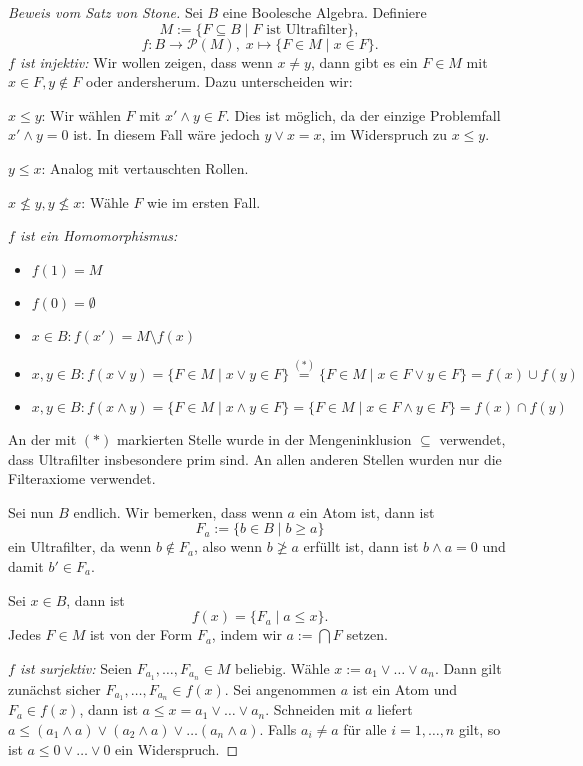 \begin{proof}[Beweis vom Satz von Stone]
    Sei $B$ eine Boolesche Algebra. Definiere
    $$ M := \{ F \subseteq B \mid F \text{ ist Ultrafilter} \}, $$
    $$ f : B \to \mathcal{P}(M), \; x \mapsto \{ F \in M \mid x \in F \}. $$
    \textit{$f$ ist injektiv:} Wir wollen zeigen, dass wenn $x \neq y$, dann gibt es ein $F \in M$ mit $x \in F, y \notin F$ oder andersherum. Dazu unterscheiden wir:

    $ x \leq y $: Wir wählen $F$ mit $x' \land y \in F$. Dies ist möglich, da der einzige Problemfall $x' \land y = 0$ ist. In diesem Fall wäre jedoch $y \lor x = x$, im Widerspruch zu $x \leq y$.

    $ y \leq x $: Analog mit vertauschten Rollen.

    $ x \nleq y, y \nleq x $: Wähle $F$ wie im ersten Fall.

    \textit{$f$ ist ein Homomorphismus:}
    \begin{itemize}
        \item $f(1) = M$
        \item $f(0) = \emptyset$
        \item $x \in B: f(x') = M \setminus f(x)$
        \item $x, y \in B: f(x \lor y) = \{ F \in M \mid x \lor y \in F \} \stackrel{(*)}{=} \{ F \in M \mid x \in F \lor y \in F \} = f(x) \cup f(y)$
        \item $x, y \in B: f(x \land y) = \{ F \in M \mid x \land y \in F \} = \{ F \in M \mid x \in F \land y \in F \} = f(x) \cap f(y)$
    \end{itemize}
    An der mit $(*)$ markierten Stelle wurde in der Mengeninklusion \glqq$\subseteq$\grqq{} verwendet, dass Ultrafilter insbesondere prim sind. An allen anderen Stellen wurden nur die Filteraxiome verwendet.

    Sei nun $B$ endlich. Wir bemerken, dass wenn $a$ ein Atom ist, dann ist
    $$ F_a := \{ b \in B \mid b \geq a \} $$
    ein Ultrafilter, da wenn $b \notin F_a$, also wenn $b \ngeq a$ erfüllt ist, dann ist $b \land a = 0$ und damit $b' \in F_a$.

    Sei $x \in B$, dann ist
    $$ f(x) = \{ F_a \mid a \leq x \}. $$
    Jedes $F \in M$ ist von der Form $F_a$, indem wir $a := \bigcap F$ setzen.

    \textit{$f$ ist surjektiv:} Seien $F_{a_1}, \hdots, F_{a_n} \in M$ beliebig. Wähle $x := a_1 \lor \hdots \lor a_n$. Dann gilt zunächst sicher $F_{a_1}, \hdots, F_{a_n} \in f(x)$. Sei angenommen $a$ ist ein Atom und $F_a \in f(x)$, dann ist $a \leq x = a_1 \lor \hdots \lor a_n$. Schneiden mit $a$ liefert $a \leq (a_1 \land a) \lor (a_2 \land a) \lor \hdots (a_n \land a)$. Falls $a_i \neq a$ für alle $i=1,\ldots,n$ gilt, so ist $a \leq 0 \lor \hdots \lor 0$ ein Widerspruch.
\end{proof}